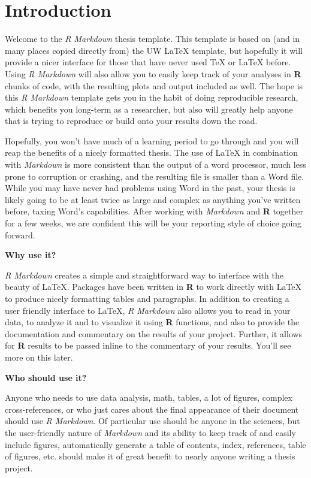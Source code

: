 \documentclass[twoside,12pt,final]{ucthesis-CA2012}
\begin{document}
\begin{ucmainmatter}

\hypertarget{intro}{%
\chapter{Introduction}\label{intro}}

Welcome to the \emph{R Markdown} thesis template. This template is based on (and in many places copied directly from) the UW LaTeX template, but hopefully it will provide a nicer interface for those that have never used TeX or LaTeX before. Using \emph{R Markdown} will also allow you to easily keep track of your analyses in \textbf{R} chunks of code, with the resulting plots and output included as well. The hope is this \emph{R Markdown} template gets you in the habit of doing reproducible research, which benefits you long-term as a researcher, but also will greatly help anyone that is trying to reproduce or build onto your results down the road.

Hopefully, you won't have much of a learning period to go through and you will reap the benefits of a nicely formatted thesis. The use of LaTeX in combination with \emph{Markdown} is more consistent than the output of a word processor, much less prone to corruption or crashing, and the resulting file is smaller than a Word file. While you may have never had problems using Word in the past, your thesis is likely going to be at least twice as large and complex as anything you've written before, taxing Word's capabilities. After working with \emph{Markdown} and \textbf{R} together for a few weeks, we are confident this will be your reporting style of choice going forward.

\textbf{Why use it?}

\emph{R Markdown} creates a simple and straightforward way to interface with the beauty of LaTeX. Packages have been written in \textbf{R} to work directly with LaTeX to produce nicely formatting tables and paragraphs. In addition to creating a user friendly interface to LaTeX, \emph{R Markdown} also allows you to read in your data, to analyze it and to visualize it using \textbf{R} functions, and also to provide the documentation and commentary on the results of your project. Further, it allows for \textbf{R} results to be passed inline to the commentary of your results. You'll see more on this later.

\textbf{Who should use it?}

Anyone who needs to use data analysis, math, tables, a lot of figures, complex cross-references, or who just cares about the final appearance of their document should use \emph{R Markdown}. Of particular use should be anyone in the sciences, but the user-friendly nature of \emph{Markdown} and its ability to keep track of and easily include figures, automatically generate a table of contents, index, references, table of figures, etc. should make it of great benefit to nearly anyone writing a thesis project.


\end{ucmainmatter}
\end{document}
